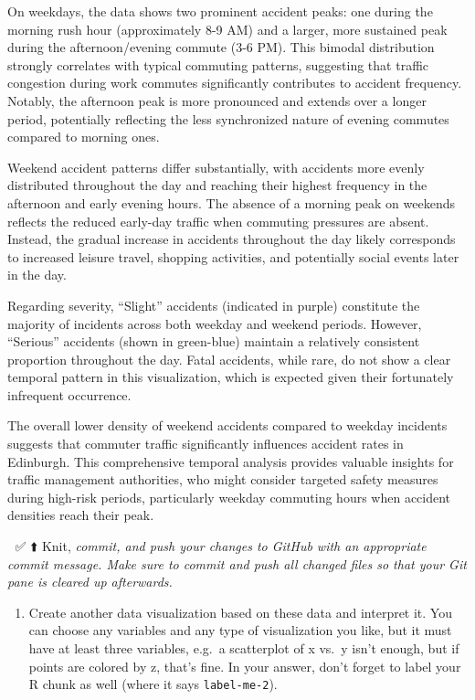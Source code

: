 \documentclass[
]{article}
\providecommand{\tightlist}{%
  \setlength{\itemsep}{0pt}\setlength{\parskip}{0pt}}
\begin{document}
On weekdays, the data shows two prominent accident peaks: one during the
morning rush hour (approximately 8-9 AM) and a larger, more sustained
peak during the afternoon/evening commute (3-6 PM). This bimodal
distribution strongly correlates with typical commuting patterns,
suggesting that traffic congestion during work commutes significantly
contributes to accident frequency. Notably, the afternoon peak is more
pronounced and extends over a longer period, potentially reflecting the
less synchronized nature of evening commutes compared to morning ones.

Weekend accident patterns differ substantially, with accidents more
evenly distributed throughout the day and reaching their highest
frequency in the afternoon and early evening hours. The absence of a
morning peak on weekends reflects the reduced early-day traffic when
commuting pressures are absent. Instead, the gradual increase in
accidents throughout the day likely corresponds to increased leisure
travel, shopping activities, and potentially social events later in the
day.

Regarding severity, ``Slight'' accidents (indicated in purple)
constitute the majority of incidents across both weekday and weekend
periods. However, ``Serious'' accidents (shown in green-blue) maintain a
relatively consistent proportion throughout the day. Fatal accidents,
while rare, do not show a clear temporal pattern in this visualization,
which is expected given their fortunately infrequent occurrence.

The overall lower density of weekend accidents compared to weekday
incidents suggests that commuter traffic significantly influences
accident rates in Edinburgh. This comprehensive temporal analysis
provides valuable insights for traffic management authorities, who might
consider targeted safety measures during high-risk periods, particularly
weekday commuting hours when accident densities reach their peak.

🧶 ✅ ⬆️ Knit, \emph{commit, and push your changes to GitHub with an
appropriate commit message. Make sure to commit and push all changed
files so that your Git pane is cleared up afterwards.}

\begin{enumerate}
\def\labelenumi{\arabic{enumi}.}
\setcounter{enumi}{3}
\tightlist
\item
  Create another data visualization based on these data and interpret
  it. You can choose any variables and any type of visualization you
  like, but it must have at least three variables, e.g.~a scatterplot of
  x vs.~y isn't enough, but if points are colored by z, that's fine. In
  your answer, don't forget to label your R chunk as well (where it says
  \texttt{label-me-2}).
\end{enumerate}
\end{document}
